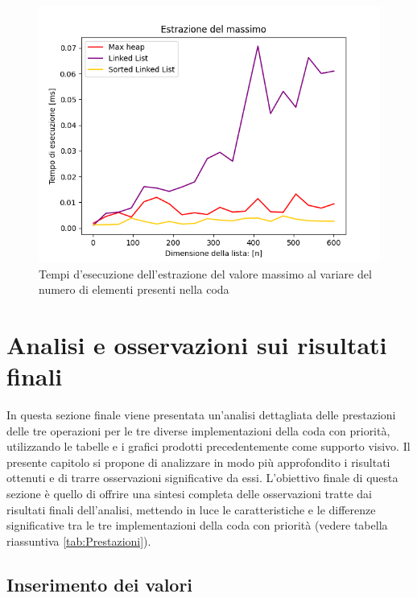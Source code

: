 \documentclass{article}
\begin{document}
\begin{figure}[h]
    \includegraphics[width=\textwidth]{Images/GraficoEstMassimo.png}
    \centering
    \caption{Tempi d'esecuzione dell'estrazione del valore massimo al variare del numero di elementi presenti nella coda}
    \label{fig:GraficoEstrazione}
\end{figure}

\clearpage

\section{Analisi e osservazioni sui risultati finali}

In questa sezione finale viene presentata un'analisi dettagliata delle prestazioni delle tre operazioni per le tre diverse implementazioni della coda con priorità, utilizzando le tabelle e i grafici prodotti precedentemente come supporto visivo. Il presente capitolo si propone di analizzare in modo più approfondito i risultati ottenuti e di trarre osservazioni significative da essi. L'obiettivo finale di questa sezione è quello di offrire una sintesi completa delle osservazioni tratte dai risultati finali dell'analisi, mettendo in luce le caratteristiche e le differenze significative tra le tre implementazioni della coda con priorità (vedere tabella riassuntiva \ref{tab:Prestazioni}).

\subsection{Inserimento dei valori}
\end{document}
